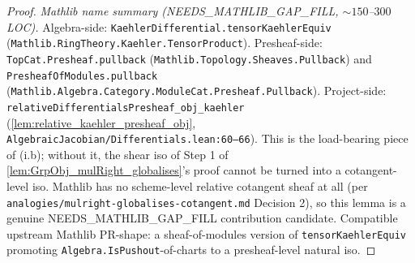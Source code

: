 \begin{proof}
  \emph{Mathlib name summary (NEEDS\_MATHLIB\_GAP\_FILL, \(\sim 150\)--\(300\) LOC).} Algebra-side: \texttt{KaehlerDifferential.tensorKaehlerEquiv} (\texttt{Mathlib.RingTheory.Kaehler.TensorProduct}). Presheaf-side: \texttt{TopCat.Presheaf.pullback} (\texttt{Mathlib.Topology.Sheaves.Pullback}) and \texttt{PresheafOfModules.pullback} (\texttt{Mathlib.Algebra.Category.ModuleCat.Presheaf.Pullback}). Project-side: \texttt{relativeDifferentialsPresheaf\_obj\_kaehler} (\cref{lem:relative_kaehler_presheaf_obj}, \texttt{AlgebraicJacobian/Differentials.lean:60--66}). This is the load-bearing piece of (i.b); without it, the shear iso of Step 1 of \cref{lem:GrpObj_mulRight_globalises}'s proof cannot be turned into a cotangent-level iso. Mathlib has no scheme-level relative cotangent sheaf at all (per \texttt{analogies/mulright-globalises-cotangent.md} Decision 2), so this lemma is a genuine NEEDS\_MATHLIB\_GAP\_FILL contribution candidate. Compatible upstream Mathlib PR-shape: a sheaf-of-modules version of \texttt{tensorKaehlerEquiv} promoting \texttt{Algebra.IsPushout}-of-charts to a presheaf-level natural iso.
\end{proof}

